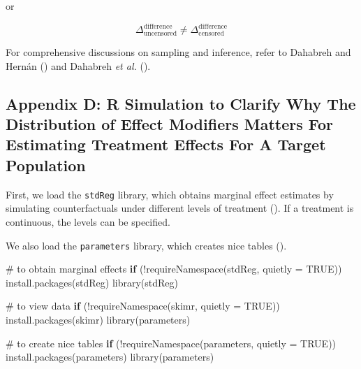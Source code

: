 \documentclass[
  single column]{article}
\newenvironment{Shaded}{\begin{snugshade}}{\end{snugshade}}
\newcommand{\AttributeTok}[1]{\textcolor[rgb]{0.40,0.45,0.13}{#1}}
\newcommand{\CommentTok}[1]{\textcolor[rgb]{0.37,0.37,0.37}{#1}}
\newcommand{\ConstantTok}[1]{\textcolor[rgb]{0.56,0.35,0.01}{#1}}
\newcommand{\ControlFlowTok}[1]{\textcolor[rgb]{0.00,0.23,0.31}{\textbf{#1}}}
\newcommand{\FunctionTok}[1]{\textcolor[rgb]{0.28,0.35,0.67}{#1}}
\newcommand{\NormalTok}[1]{\textcolor[rgb]{0.00,0.23,0.31}{#1}}
\newcommand{\SpecialCharTok}[1]{\textcolor[rgb]{0.37,0.37,0.37}{#1}}
\newcommand{\StringTok}[1]{\textcolor[rgb]{0.13,0.47,0.30}{#1}}
\begin{document}
or

\[
\Delta^{\text{difference}}_{\text{uncensored}} \ne \Delta^{\text{difference}}_{\text{censored}}
\]

For comprehensive discussions on sampling and inference, refer to
Dahabreh and Hernán () and Dahabreh
\emph{et al.} ().

\newpage{}

\subsection{Appendix D: R Simulation to Clarify Why The Distribution of
Effect Modifiers Matters For Estimating Treatment Effects For A Target
Population}\label{id-app-d}

First, we load the \texttt{stdReg} library, which obtains marginal
effect estimates by simulating counterfactuals under different levels of
treatment (). If a
treatment is continuous, the levels can be specified.

We also load the \texttt{parameters} library, which creates nice tables
().

\begin{Shaded}
\begin{Highlighting}[]
\CommentTok{\# to obtain marginal effects}
\ControlFlowTok{if}\NormalTok{ (}\SpecialCharTok{!}\FunctionTok{requireNamespace}\NormalTok{(}\StringTok{\textquotesingle{}stdReg\textquotesingle{}}\NormalTok{, }\AttributeTok{quietly =} \ConstantTok{TRUE}\NormalTok{)) }\FunctionTok{install.packages}\NormalTok{(}\StringTok{\textquotesingle{}stdReg\textquotesingle{}}\NormalTok{)}
\FunctionTok{library}\NormalTok{(stdReg)}

\CommentTok{\#  to view data}
\ControlFlowTok{if}\NormalTok{ (}\SpecialCharTok{!}\FunctionTok{requireNamespace}\NormalTok{(}\StringTok{\textquotesingle{}skimr\textquotesingle{}}\NormalTok{, }\AttributeTok{quietly =} \ConstantTok{TRUE}\NormalTok{)) }\FunctionTok{install.packages}\NormalTok{(}\StringTok{\textquotesingle{}skimr\textquotesingle{}}\NormalTok{)}
\FunctionTok{library}\NormalTok{(parameters)}

\CommentTok{\# to create nice tables}
\ControlFlowTok{if}\NormalTok{ (}\SpecialCharTok{!}\FunctionTok{requireNamespace}\NormalTok{(}\StringTok{\textquotesingle{}parameters\textquotesingle{}}\NormalTok{, }\AttributeTok{quietly =} \ConstantTok{TRUE}\NormalTok{)) }\FunctionTok{install.packages}\NormalTok{(}\StringTok{\textquotesingle{}parameters\textquotesingle{}}\NormalTok{)}
\FunctionTok{library}\NormalTok{(parameters)}
\end{Highlighting}
\end{Shaded}
\end{document}
